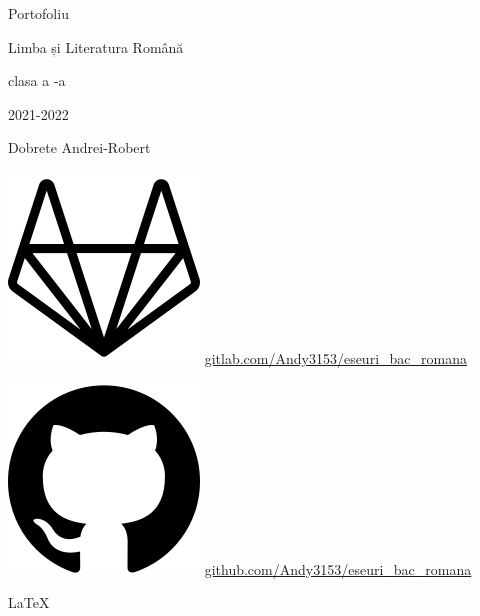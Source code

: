\documentclass[
12pt,
a4paper
]{article}
\author{} %
\newcommand{\rom}[1]{\uppercase\expandafter{\romannumeral #1\relax}} %
\begin{document}
\begin{center}
 \vspace{9cm}
 {\LARGE Portofoliu}

 \vspace{0.5cm}
 {\Huge Limba și Literatura Română}

 \vspace{0.5cm}
 {\Large clasa a \rom{12}-a}

 \vspace{0.5cm}
 {2021-2022}

 \vspace{0.5cm}
 {\LARGE Dobrete Andrei-Robert}

 \vfill
 \includegraphics[height=\fontcharht\font`\B]{gitlab}
 \url{gitlab.com/Andy3153/eseuri_bac_romana}

 \includegraphics[height=\fontcharht\font`\B]{github}
 \url{github.com/Andy3153/eseuri_bac_romana}

 \vspace{0.5cm}
 {\large\LaTeX}
\end{center}
\end{document}
